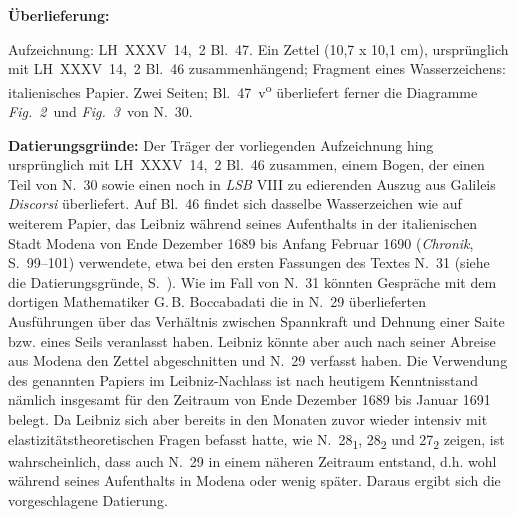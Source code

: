 %
%
%
%
%
\frenchspacing%
%
\begin{ledgroupsized}[r]{120mm}%
\footnotesize%
\pstart%
\noindent%
\textbf{Überlieferung:}%
\pend%
\end{ledgroupsized}%
\begin{ledgroupsized}[r]{114mm}%
\footnotesize%
\pstart%
\parindent -6mm%
%
Aufzeichnung: LH~XXXV~14,~2 Bl.~47.
Ein Zettel (10,7 x 10,1 cm),
ursprünglich mit LH~XXXV~14,~2 Bl.~46 zusammenhängend; %
Fragment eines Wasserzeichens: italienisches Papier.
Zwei Seiten;
Bl.~47~v\textsuperscript{o} überliefert ferner die Diagramme \lbrack\textit{Fig.~2}\rbrack\ und \lbrack\textit{Fig.~3}\rbrack\ von N.~30.
\pend%
\end{ledgroupsized}%
%
\vspace*{5mm}%
\begin{ledgroup}%
\footnotesize%
\pstart%
\noindent%
\textbf{Datierungsgründe:}\label{LH_35_14_02_047_datierung}
Der Träger der vorliegenden Aufzeichnung hing ursprünglich mit LH~XXXV~14,~2 Bl.~46 zusammen, einem Bogen, der einen Teil von N.~30 sowie einen noch in \textit{LSB} VIII zu edierenden Auszug aus Galileis \textit{Discorsi} überliefert.%
\protect{}
Auf Bl.~46 findet sich dasselbe Wasserzeichen wie auf weiterem Papier, das Leibniz während seines Aufenthalts in der italienischen Stadt Modena von Ende Dezember 1689 bis Anfang Februar 1690 (\textit{Chronik}, S.~99–101\cite{01236}) verwendete, etwa bei den ersten Fassungen des Textes N.~31 (siehe die Datierungsgründe, S.~\pageref{LH_35_10_17_005-008_intro}).%
\protect{}\protect{}
Wie im Fall von N.~31 könnten Gespräche mit dem dortigen Mathematiker G.\,B. Boccabadati die in N.~29 überlieferten Ausführungen über das Verhältnis zwischen Spannkraft und Dehnung einer Saite bzw. eines Seils veranlasst haben.\protect{}
Leibniz könnte aber auch nach seiner Abreise aus Modena den Zettel abgeschnitten und N.~29 verfasst haben.
Die Verwendung des genannten Papiers im Leibniz-Nachlass ist nach heutigem Kenntnisstand nämlich insgesamt für den Zeitraum von Ende Dezember 1689 bis Januar 1691 belegt. 
Da Leibniz sich aber bereits in den Monaten zuvor wieder intensiv mit elastizitätstheoretischen Fragen befasst hatte, wie N.~28\textsubscript{1}, 28\textsubscript{2} und 27\textsubscript{2} zeigen, ist wahrscheinlich, dass auch N.~29 in einem näheren Zeitraum entstand, d.h. wohl während seines Aufenthalts in Modena oder wenig später.
Daraus ergibt sich die vorgeschlagene Datierung.
\pend%
\end{ledgroup}%
